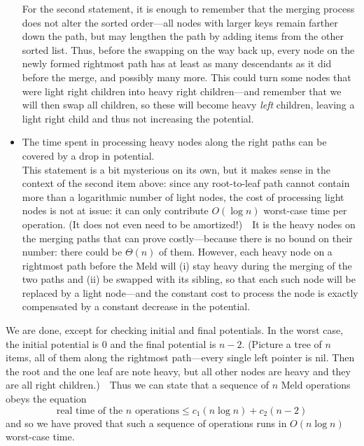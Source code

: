 \documentclass[11pt]{article}
\begin{document}
\begin{itemize}
      For the second statement, it is enough to remember that the 
      merging process does not alter the sorted order---all nodes
      with larger keys remain farther down the path, but may lengthen
      the path by adding items from the other sorted list.  Thus, before
      the swapping on the way back up, every node on the newly formed rightmost
      path has at least as many descendants as it did before the merge,
      and possibly many more.  This could turn some nodes that were light
      right children into heavy right children---and remember that we
      will then swap all children, so these will become heavy \emph{left}
      children, leaving a light right child and thus not increasing the
      potential.
    \item
      The time spent in processing heavy nodes along the right paths can be
      covered by a drop in potential.\\
      This statement is a bit mysterious on its own, but it makes sense
      in the context of the second item above: since any root-to-leaf
      path cannot contain more than a logarithmic number of light nodes,
      the cost of processing light nodes is not at issue: it can only
      contribute $O(\log n)$ worst-case time per operation.  (It does not
      even need to be amortized!)\ \  It is the heavy nodes on the merging
      paths that can prove costly---because there is no bound on their
      number: there could be $\Theta(n)$ of them.
      However, each heavy node on a rightmost path before the Meld
      will (i) stay heavy during the merging of the two paths and (ii)
      be swapped with its sibling, so that each such node will be replaced
      by a light node---and the constant cost to process the node is
      exactly compensated by a constant decrease in the potential.
  \end{itemize}
We are done, except for checking initial and final potentials.
In the worst case, the initial potential is 0 and the final potential
is $n-2$.  (Picture a tree of $n$ items, all of them along the rightmost
path---every single left pointer is nil.  Then the root and the one leaf
are note heavy, but all other nodes are heavy and they are all right
children.)\ \ Thus we can state that a sequence of $n$ Meld operations
obeys the equation
  $$\text{real time of the $n$ operations} \leq c_1(n\log n) + c_2(n-2)$$
and so we have proved that such a sequence of operations runs in
$O(n\log n)$ worst-case time.
\end{document}
